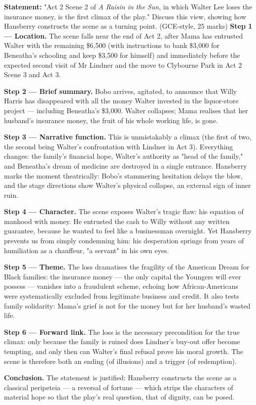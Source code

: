 \documentclass[11pt]{article}
\newcommand{\cle}[1]{{\popxbold\color{popdark}#1}}
\begin{document}
\begin{exoresolu}
\textbf{Statement:} "Act 2 Scene 2 of \emph{A Raisin in the Sun}, in which Walter Lee loses the insurance money, is the first climax of the play." Discuss this view, showing how Hansberry constructs the scene as a turning point. (GCE-style, 25 marks)
\tcblower
\textbf{Step 1 — Location.} The scene falls near the end of Act 2, after Mama has entrusted Walter with the remaining \$6,500 (with instructions to bank \$3,000 for Beneatha's schooling and keep \$3,500 for himself) and immediately before the expected second visit of Mr Lindner and the move to Clybourne Park in Act 2 Scene 3 and Act 3.

\textbf{Step 2 — Brief summary.} Bobo arrives, agitated, to announce that Willy Harris has disappeared with all the money Walter invested in the liquor-store project — including Beneatha's \$3,000. Walter collapses; Mama realises that her husband's insurance money, the fruit of his whole working life, is gone.

\textbf{Step 3 — Narrative function.} This is unmistakably a \cle{climax} (the first of two, the second being Walter's confrontation with Lindner in Act 3). Everything changes: the family's financial hope, Walter's authority as "head of the family," and Beneatha's dream of medicine are destroyed in a single entrance. Hansberry marks the moment theatrically: Bobo's stammering hesitation delays the blow, and the stage directions show Walter's physical collapse, an external sign of inner ruin.

\textbf{Step 4 — Character.} The scene exposes Walter's tragic flaw: his equation of \cle{manhood with money}. He entrusted the cash to Willy without any written guarantee, because he wanted to feel like a businessman overnight. Yet Hansberry prevents us from simply condemning him: his desperation springs from years of humiliation as a chauffeur, "a servant" in his own eyes.

\textbf{Step 5 — Theme.} The loss dramatises the fragility of the \cle{American Dream} for Black families: the insurance money — the only capital the Youngers will ever possess — vanishes into a fraudulent scheme, echoing how African-Americans were systematically excluded from legitimate business and credit. It also tests \cle{family solidarity}: Mama's grief is not for the money but for her husband's wasted life.

\textbf{Step 6 — Forward link.} The loss is the necessary precondition for the true climax: only because the family is ruined does Lindner's buy-out offer become tempting, and only then can Walter's final refusal prove his moral growth. The scene is therefore both an ending (of illusions) and a trigger (of redemption).

\textbf{Conclusion.} The statement is justified: Hansberry constructs the scene as a classical peripeteia — a reversal of fortune — which strips the characters of material hope so that the play's real question, that of dignity, can be posed.
\end{exoresolu}
\end{document}
